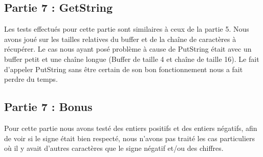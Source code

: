 \documentclass[a4paper]{article}
\begin{document}
\subsection{Partie 7 : GetString}

Les tests effectués pour cette partie sont similaires à ceux de la partie 5. Nous
avons joué sur les tailles relatives du buffer et de la chaîne de caractères à
récupérer. Le cas nous ayant posé problème à cause de PutString était avec un buffer
petit et une chaîne longue (Buffer de taille 4 et chaîne de taille 16). Le fait
d'appeler PutString sans être certain de son bon fonctionnement nous a fait perdre
du temps.

\subsection{Partie 7 : Bonus}

Pour cette partie nous avons testé des entiers positifs et des entiers négatifs, afin
de voir si le signe était bien respecté, nous n'avons pas traité les cas particuliers
où il y avait d'autres caractères que le signe négatif et/ou des chiffres.

\end{document}
